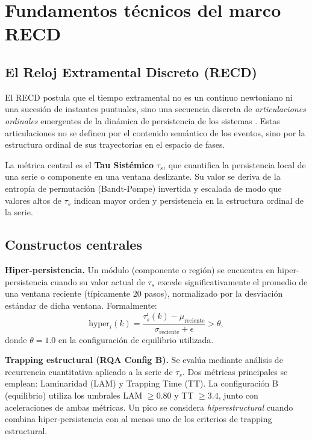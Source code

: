 \section{Fundamentos técnicos del marco RECD}

\subsection{El Reloj Extramental Discreto (RECD)}

El RECD postula que el tiempo extramental no es un continuo newtoniano ni una sucesión de instantes puntuales, sino una secuencia discreta de \textit{articulaciones ordinales} emergentes de la dinámica de persistencia de los sistemas \citep{padilla_recd_preprint_2025,padilla_tau_sistemic_2025}. Estas articulaciones no se definen por el contenido semántico de los eventos, sino por la estructura ordinal de sus trayectorias en el espacio de fases.

La métrica central es el \textbf{Tau Sistémico} $\tau_s$, que cuantifica la persistencia local de una serie o componente en una ventana deslizante. Su valor se deriva de la entropía de permutación (Bandt-Pompe) invertida y escalada de modo que valores altos de $\tau_s$ indican mayor orden y persistencia en la estructura ordinal de la serie.

\subsection{Constructos centrales}

\textbf{Hiper-persistencia.} Un módulo (componente o región) se encuentra en hiper-persistencia cuando su valor actual de $\tau_s$ excede significativamente el promedio de una ventana reciente (típicamente 20 pasos), normalizado por la desviación estándar de dicha ventana. Formalmente:
\[
\text{hyper}_i(k) = \frac{\tau_s^i(k) - \mu_{\text{reciente}}}{\sigma_{\text{reciente}} + \epsilon} > \theta,
\]
donde $\theta = 1.0$ en la configuración de equilibrio utilizada.

\textbf{Trapping estructural (RQA Config B).} Se evalúa mediante análisis de recurrencia cuantitativa aplicado a la serie de $\tau_s$. Dos métricas principales se emplean: Laminaridad (LAM) y Trapping Time (TT). La configuración B (equilibrio) utiliza los umbrales LAM $\geq 0.80$ y TT $\geq 3.4$, junto con aceleraciones de ambas métricas. Un pico se considera \textit{hiperestructural} cuando combina hiper-persistencia con al menos uno de los criterios de trapping estructural.

